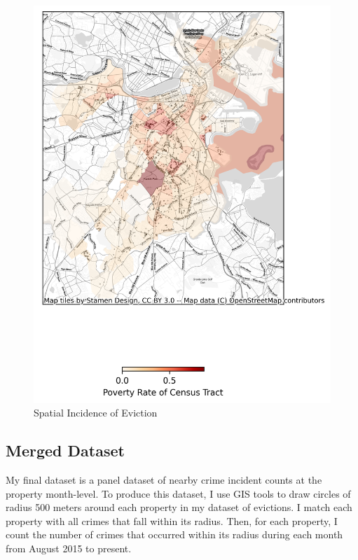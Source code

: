 \documentclass[12pt]{article}
\begin{document}
            \begin{figure}[H]
            \centering
            \includegraphics{output/summary_statistics/figures/evictions_map.png}
            \caption{Spatial Incidence of Eviction}
            \label{fig:my_label}
        \end{figure}

    \subsection{Merged Dataset}
    My final dataset is a panel dataset of nearby crime incident counts at the property month-level. To produce this dataset, I use GIS tools to draw circles of radius 500 meters around each property in my dataset of evictions. I match each property with all crimes that fall within its radius. Then, for each property, I count the number of crimes that occurred within its radius during each month from August 2015 to present. 
\end{document}
